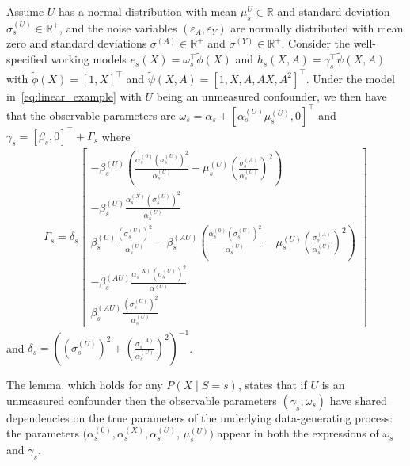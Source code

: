 \documentclass{article}
\begin{document}
\begin{lemma} \label{lem:linear_setting}
   Assume $U$ has a normal distribution with mean $\mu_s^{U}\in\mathbb{R}$ and standard deviation $\sigma_s^{(U)}\in\mathbb{R}^+$, and the noise variables $(\varepsilon_A, \varepsilon_Y)$ are normally distributed with mean zero and standard deviations $\sigma^{(A)}\in\mathbb{R}^+$ and $\sigma^{(Y)}\in\mathbb{R}^+$.  Consider the well-specified working models $e_s(X)=\omega_s^\top \widetilde\phi(X)$ and $h_s(X,A)=\gamma_{s}^\top \widetilde\psi(X, A)$ with $\widetilde\phi(X)=[1,X]^\top$ and $\widetilde\psi(X, A)=[1,X,A,AX,A^2]^\top$. Under the model in~\eqref{eq:linear_example} with $U$ being an unmeasured confounder, we then have that the observable parameters are $\omega_s=\alpha_s + [\alpha_{s}^{(U)} \mu_{s}^{(U)}, 0]^\top$ and $\gamma_s = [\beta_s, 0]^\top + \Gamma_s$ where
    \begin{align*}
        \Gamma_s = 
        \delta_s 
        \begin{bmatrix}
        - \beta_s^{(U)} \left( \frac{\alpha_s^{(0)}(\sigma_s^{(U)})^{2} }{\alpha_s^{(U)}} - \mu_s^{(U)}\left(\frac{\sigma_s^{(A)}}{\alpha_s^{(U)}}\right)^2 \right) \\
        -  \beta_s^{(U)} \frac{\alpha_s^{(X)}(\sigma_s^{(U)})^{2}}{\alpha_s^{(U)}}  \\
        \beta_s^{(U)} \frac{(\sigma_s^{(U)})^2}{\alpha_s^{(U)}}  - \beta_s^{(AU)} \left( \frac{\alpha_s^{(0)}(\sigma_s^{(U)})^{2}}{\alpha_s^{(U)}} - \mu_s^{(U)}\left(\frac{\sigma_s^{(A)}}{\alpha_s^{(U)}}\right)^2 \right) \\
        - \beta_s^{(AU)}\frac{\alpha_s^{(X)} (\sigma_s^{(U)})^{2}}{\alpha^{(U)}}  \\[0.1cm]
        \beta_s^{(AU)}  \frac{(\sigma_s^{(U)})^2}{\alpha_s^{(U)}} 
        \end{bmatrix}
    \end{align*}
    and $\delta_s =\left( (\sigma_s^{(U)})^2  +\left(\frac{\sigma_s^{(A)}}{\alpha_s^{(U)}}\right)^2\right)^{-1}$.
\end{lemma}
The lemma, which holds for any $P(X\mid S=s)$, states that if $U$ is an unmeasured confounder then the observable parameters  $(\gamma_s,\omega_s)$ have shared dependencies on the true parameters of the underlying data-generating process: the parameters $(\alpha_{s}^{(0)}, \alpha_{s}^{(X)}, \alpha_{s}^{(U)}$, $\mu_{s}^{(U)})$ appear in both the expressions of $\omega_s$ and $\gamma_s$. %
\end{document}
